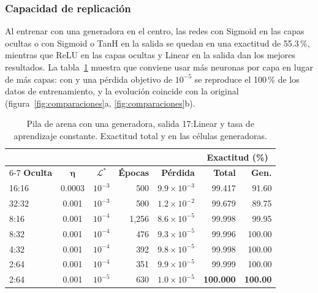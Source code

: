 \subsubsection{Capacidad de replicación}
Al entrenar con una generadora en el centro, las redes con Sigmoid en las capas ocultas o con Sigmoid o TanH en la salida se quedan en una exactitud de 55.3\,\%, mientras que ReLU en las capas ocultas y Linear en la salida dan los mejores resultados. La tabla~\ref{tab:sp_arquitecturas} muestra que conviene usar más neuronas por capa en lugar de más capas: con  y una pérdida objetivo de $10^{-5}$ se reproduce el 100\,\% de los datos de entrenamiento, y la evolución coincide con la original (figura~\ref{fig:comparaciones}a, \ref{fig:comparaciones}b).

\begin{table}[!t]
	\centering
	\footnotesize
	\setlength{\tabcolsep}{3pt}
	\begin{tabular}{@{}lccrrrr@{}}
		\toprule
		& & & & & \multicolumn{2}{c}{\textbf{Exactitud (\%)}} \\
		\cmidrule(l){6-7}
		\textbf{Oculta} & $\boldsymbol{\eta}$ & $\boldsymbol{\mathcal{L}^*}$ & \textbf{Épocas} & \textbf{Pérdida} & \textbf{Total} & \textbf{Gen.} \\
		\midrule
		16:16 & 0.0003 & $10^{-3}$ & 500 & $9.9\times10^{-3}$ & 99.417 & 91.60 \\
		32:32 & 0.001 & $10^{-3}$ & 500 & $1.2\times10^{-2}$ & 99.679 & 89.75 \\
		8:16 & 0.001 & $10^{-4}$ & 1,256 & $8.6\times10^{-5}$ & 99.998 & 99.95 \\
		8:32 & 0.001 & $10^{-4}$ & 476 & $9.3\times10^{-5}$ & 99.996 & 100.00 \\
		4:32 & 0.001 & $10^{-4}$ & 392 & $9.8\times10^{-5}$ & 99.998 & 100.00 \\
		2:64 & 0.001 & $10^{-4}$ & 351 & $9.9\times10^{-5}$ & 99.999 & 100.00 \\
		2:64 & 0.001 & $10^{-5}$ & 630 & $1.0\times10^{-5}$ & \textbf{100.000} & \textbf{100.00} \\
		\bottomrule
	\end{tabular}
	\caption{Pila de arena con una generadora, salida 17:Linear y tasa de aprendizaje constante. Exactitud total y en las células generadoras.}
	\label{tab:sp_arquitecturas}
\end{table}


